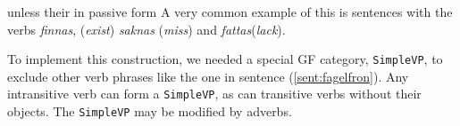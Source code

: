 \documentclass{report}
\begin{document}
unless their in passive form
A very common example of this is sentences with the verbs \emph{finnas},
(\emph{exist})
\emph{saknas} (\emph{miss}) and \emph{fattas}(\emph{lack}).


To implement this construction, we needed a
special GF category, \verb|SimpleVP|, to exclude other verb phrases
like the one in sentence (\ref{sent:fagelfron}). Any intransitive verb can form
a \verb-SimpleVP-, as can transitive verbs without their objects. The \verb-SimpleVP-
may be modified by adverbs.
\end{document}

